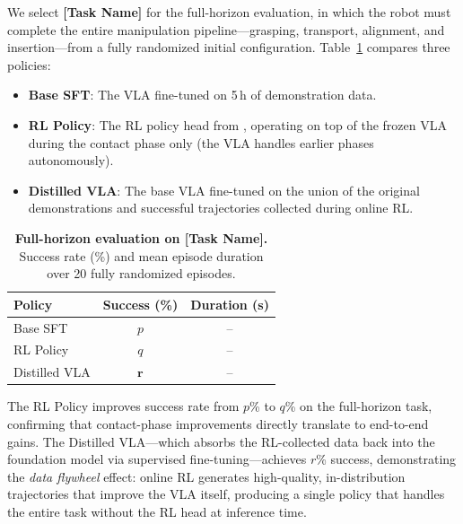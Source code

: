 We select \textbf{[Task Name]} for the full-horizon evaluation, in which the robot must complete the entire manipulation pipeline---grasping, transport, alignment, and insertion---from a fully randomized initial configuration. Table~\ref{tab:distill} compares three policies:
\begin{itemize}[leftmargin=*, itemsep=2pt]
    \item \textbf{Base SFT}: The VLA fine-tuned on 5\,h of demonstration data.
    \item \textbf{RL Policy}: The RL policy head from \MethodName{}, operating on top of the frozen VLA during the contact phase only (the VLA handles earlier phases autonomously).
    \item \textbf{Distilled VLA}: The base VLA fine-tuned on the union of the original demonstrations and successful trajectories collected during online RL.
\end{itemize}

\begin{table}[t]
\centering
\caption{\textbf{Full-horizon evaluation on [Task Name].} Success rate (\%) and mean episode duration over 20 fully randomized episodes.}
\label{tab:distill}
\begin{tabular}{l c c}
\toprule
Policy & Success (\%) & Duration (s) \\
\midrule
Base SFT         & $p$ & -- \\
RL Policy        & $q$ & -- \\
Distilled VLA    & $\mathbf{r}$ & -- \\
\bottomrule
\end{tabular}
\end{table}

The RL Policy improves success rate from $p$\% to $q$\% on the full-horizon task, confirming that contact-phase improvements directly translate to end-to-end gains. The Distilled VLA---which absorbs the RL-collected data back into the foundation model via supervised fine-tuning---achieves $r$\% success, demonstrating the \emph{data flywheel} effect: online RL generates high-quality, in-distribution trajectories that improve the VLA itself, producing a single policy that handles the entire task without the RL head at inference time.

\fi


